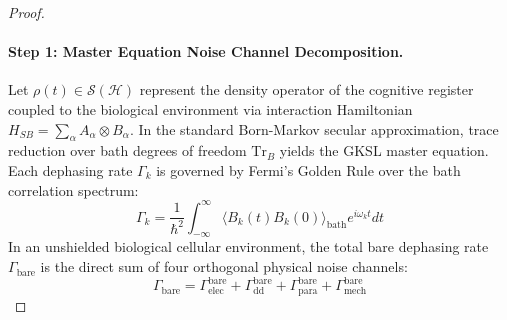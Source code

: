 \documentclass[10pt,twocolumn,3p]{article}
\begin{document}
\begin{proof}
\paragraph{Step 1: Master Equation Noise Channel Decomposition.}
Let $\rho(t) \in \mathcal{S}(\mathcal{H})$ represent the density operator of the cognitive register coupled to the biological environment via interaction Hamiltonian $H_{SB} = \sum_\alpha A_\alpha \otimes B_\alpha$. In the standard Born-Markov secular approximation, trace reduction over bath degrees of freedom $\text{Tr}_B$ yields the GKSL master equation. Each dephasing rate $\Gamma_k$ is governed by Fermi's Golden Rule over the bath correlation spectrum:
\begin{equation}
    \Gamma_k = \frac{1}{\hbar^2} \int_{-\infty}^\infty \langle B_k(t) B_k(0) \rangle_{\text{bath}} e^{i \omega_k t} dt
\end{equation}
In an unshielded biological cellular environment, the total bare dephasing rate $\Gamma_{\text{bare}}$ is the direct sum of four orthogonal physical noise channels:
\begin{equation}
    \Gamma_{\text{bare}} = \Gamma_{\text{elec}}^{\text{bare}} + \Gamma_{\text{dd}}^{\text{bare}} + \Gamma_{\text{para}}^{\text{bare}} + \Gamma_{\text{mech}}^{\text{bare}}
\end{equation}


\end{proof}
\end{document}
